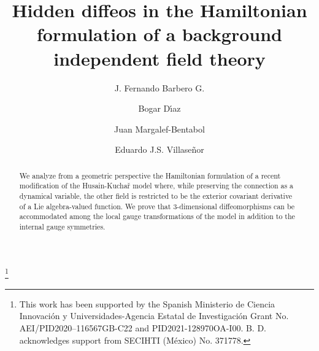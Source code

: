 \documentclass[12pt]{amsart}
\theoremstyle{plain}
\theoremstyle{definition}
\theoremstyle{remark}
\numberwithin{equation}{section}  %
\begin{document}
\thanks{This work has been supported by the Spanish Ministerio de Ciencia 
Innovación y Universidades-Agencia Estatal de  Investigación Grant No. AEI/PID2020–116567GB-C22 and PID2021-128970OA-I00. B. D. acknowledges support from SECIHTI (M\'exico)  No. 371778. }








\title[Hidden diffeos in a background independent field theory]{Hidden diffeos in the Hamiltonian formulation of a background independent field theory}
\author[J.F. Barbero G.]{J. Fernando Barbero G.}
\address{J. Fernando Barbero G., \href{https://ror.org/05rtchs68}{Instituto de Estructura de la Materia}, IEM-CSIC, Serrano 123, 28006 Madrid, Spain}



\author[B. D\'{\i}az]{Bogar D\'{\i}az}
\address{Bogar D\'{\i}az, \href{https://ror.org/03n6nwv02}{Universidad Politécnica de Madrid}, Group of Biometrics, Biosignals, Security and Smart Mobility (GB2S), E.T.S.I. Minas y Energía, C. de Ríos Rosas, 21, 28003, Madrid, Spain \\ \href{https://ror.org/01tmp8f25}{Universidad Nacional Aut\'onoma de M\'exico}, Departamento de F\'isica de Altas Energ\'ias, Instituto de Ciencias Nucleares, Apartado Postal 70-543, Ciudad de M\'exico, 04510, M\'exico}



\author[J. Margalef-Bentabol]{Juan Margalef-Bentabol}
\address{Juan Margalef-Bentabol, \href{https://ror.org/03ths8210}{Universidad Carlos III de Madrid}, Departamento de Matemáticas, Avenida de la Universidad, 30 (edificio Sabatini), 28911, Legan\'es (Madrid), España}


\author[E.J.S. Villase\~nor]{Eduardo J.S. Villase\~nor}
\address{Eduardo J.S. Villase\~nor, \href{https://ror.org/03ths8210}{Universidad Carlos III de Madrid}, Departamento de Matemáticas, Avenida de la Universidad, 30 (edificio Sabatini), 28911, Legan\'es (Madrid), España}





\begin{abstract}
    

    We analyze from a geometric perspective the Hamiltonian formulation of a recent modification of the Husain-Kuchař model where, while preserving the connection as a dynamical variable, the other field is restricted to be the exterior covariant derivative of a Lie algebra-valued function. We prove that 3-dimensional diffeomorphisms can be accommodated among the local gauge transformations of the model in addition to the internal gauge symmetries.
\end{abstract}
\end{document}
